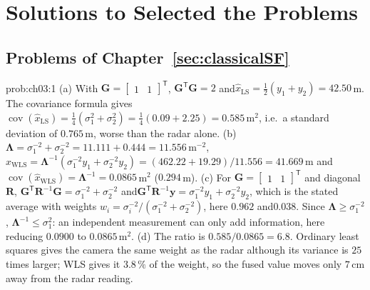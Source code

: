 \documentclass[graybox,envcountchap]{style/SNmono}
\providecommand{\DIFadd}[1]{{\protect\color{blue} #1}} %
\providecommand{\DIFdel}[1]{{\protect\color{red} #1}} %
\providecommand{\DIFaddbegin}{} %
\providecommand{\DIFaddend}{} %
\begin{document}
\clearpage



\backmatter
\clearpage
\chapter*{Solutions to \DIFdel{Selected }\DIFadd{the }Problems}

\section*{Problems of Chapter~\ref{sec:classicalSF}}


\begin{sol}{prob:ch03:1}
(a) With $\mathbf{G}=\begin{bmatrix}1&1\end{bmatrix}^{\mathsf T}$, $\mathbf{G}^{\mathsf T}\mathbf{G}=2$ and\DIFaddbegin \allowbreak \DIFaddend $\widehat{x}_{\mathrm{LS}}=\tfrac12(y_1+y_2)=42.50$\,m. The covariance formula gives $\operatorname{cov}(\widehat{x}_{\mathrm{LS}})=\tfrac14(\sigma_1^{2}+\sigma_2^{2})=\tfrac14(0.09+2.25)=0.585$\,m$^{2}$, i.e.\ a standard deviation of $0.765$\,m, worse than the radar alone.
(b) $\mathbf{\Lambda}=\sigma_1^{-2}+\sigma_2^{-2}=11.111+0.444=11.556$\,m$^{-2}$, $\widehat{x}_{\mathrm{WLS}}=\mathbf{\Lambda}^{-1}(\sigma_1^{-2}y_1+\sigma_2^{-2}y_2)=(462.22+19.29)/11.556=41.669$\,m and $\operatorname{cov}(\widehat{x}_{\mathrm{WLS}})=\mathbf{\Lambda}^{-1}=0.0865$\,m$^{2}$ ($0.294$\,m).
(c) For $\mathbf{G}=\begin{bmatrix}1&1\end{bmatrix}^{\mathsf T}$ and diagonal $\mathbf{R}$, $\mathbf{G}^{\mathsf T}\mathbf{R}^{-1}\mathbf{G}=\sigma_1^{-2}+\sigma_2^{-2}$ and\DIFaddbegin \allowbreak \DIFaddend $\mathbf{G}^{\mathsf T}\mathbf{R}^{-1}\mathbf{y}=\sigma_1^{-2}y_1+\sigma_2^{-2}y_2$, which is the stated average with weights $w_i=\sigma_i^{-2}/(\sigma_1^{-2}+\sigma_2^{-2})$, here $0.962$ and\DIFaddbegin \allowbreak \DIFaddend $0.038$. Since $\mathbf{\Lambda}\ge\sigma_1^{-2}$, $\mathbf{\Lambda}^{-1}\le\sigma_1^{2}$: an independent measurement can only add information, here reducing $0.0900$ to $0.0865$\,m$^{2}$.
(d) The ratio is $0.585/0.0865=6.8$. Ordinary least squares gives the camera the same weight as the radar although its variance is $25$ times larger; WLS gives it $3.8\,\%$ of the weight, so the fused value moves only $7$\,cm away from the radar reading.
\end{sol}
\end{document}
